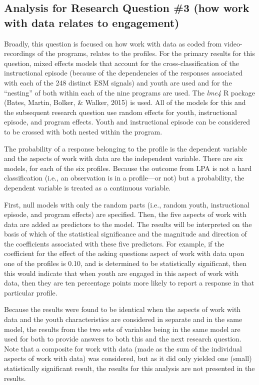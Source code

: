 \documentclass[]{book}
\theoremstyle{definition}
\theoremstyle{definition}
\theoremstyle{definition}
\theoremstyle{remark}
\begin{document}
\subsection{Analysis for Research Question \#3 (how work with data
relates to
engagement)}\label{analysis-for-research-question-3-how-work-with-data-relates-to-engagement}

Broadly, this question is focused on how work with data as coded from
video-recordings of the programs, relates to the profiles. For the
primary results for this question, mixed effects models that account for
the cross-classification of the instructional episode (because of the
dependencies of the responses associated with each of the 248 distinct
ESM signals) and youth are used and for the ``nesting'' of both within
each of the nine programs are used. The \emph{lme4} R package (Bates,
Martin, Bolker, \& Walker, 2015) is used. All of the models for this and
the subsequent research question use random effects for youth,
instructional episode, and program effects. Youth and instructional
episode can be considered to be crossed with both nested within the
program.

The probability of a response belonging to the profile is the dependent
variable and the aspects of work with data are the independent variable.
There are six models, for each of the six profiles. Because the outcome
from LPA is not a hard classification (i.e., an observation is in a
profile---or not) but a probability, the dependent variable is treated
as a continuous variable.

First, null models with only the random parts (i.e., random youth,
instructional episode, and program effects) are specified. Then, the
five aspects of work with data are added as predictors to the model. The
results will be interpreted on the basis of which of the statistical
significance and the magnitude and direction of the coefficients
associated with these five predictors. For example, if the coefficient
for the effect of the asking questions aspect of work with data upon one
of the profiles is 0.10, and is determined to be statistically
significant, then this would indicate that when youth are engaged in
this aspect of work with data, then they are ten percentage points more
likely to report a response in that particular profile.

Because the results were found to be identical when the aspects of work
with data and the youth characteristics are considered in separate and
in the same model, the results from the two sets of variables being in
the same model are used for both to provide answers to both this and the
next research question. Note that a composite for work with data (made
as the sum of the individual aspects of work with data) was considered,
but as it did only yielded one (small) statistically significant result,
the results for this analysis are not presented in the results.
\end{document}
